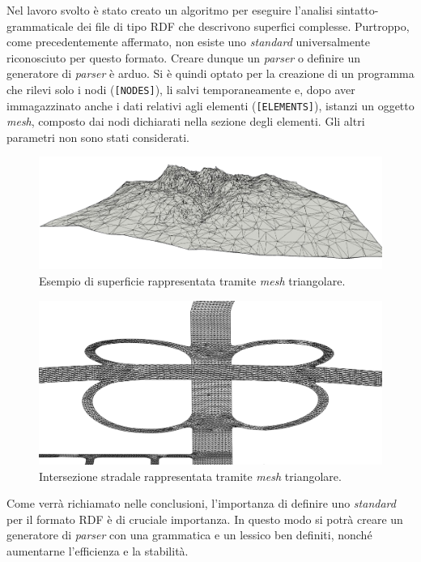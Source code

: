 Nel lavoro svolto è stato creato un algoritmo per eseguire l'analisi sintatto-grammaticale dei file di tipo \ac{RDF} che descrivono superfici complesse. Purtroppo, come precedentemente affermato, non esiste uno \textit{standard} universalmente riconosciuto per questo formato. Creare dunque un \textit{parser} o definire un generatore di \textit{parser} è arduo. Si è quindi optato per la creazione di un programma che rilevi solo i nodi (\texttt{[NODES]}), li salvi temporaneamente e, dopo aver immagazzinato anche i dati relativi agli elementi (\texttt{[ELEMENTS]}), istanzi un oggetto \textit{mesh}, composto dai nodi dichiarati nella sezione degli elementi. Gli altri parametri non sono stati considerati.

\begin{figure}
	\centering
	\includegraphics[width=0.7\linewidth]{Figures/mesh}
	\caption{Esempio di superficie rappresentata tramite \textit{mesh} triangolare.}
\end{figure}
\begin{figure}
	\centering
	\includegraphics[width=0.7\linewidth]{Figures/mesh_1}
	\caption{Intersezione stradale rappresentata tramite \textit{mesh} triangolare.}
\end{figure}

Come verrà richiamato nelle conclusioni, l'importanza di definire uno \textit{standard} per il formato \ac{RDF} è di cruciale importanza. In questo modo si potrà creare un generatore di \textit{parser} con una grammatica e un lessico ben definiti, nonché aumentarne l'efficienza e la stabilità.